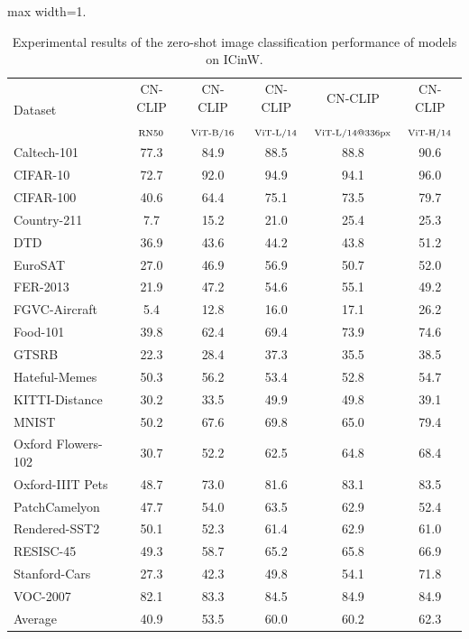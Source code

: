 \begin{table}[t]
\center
\small
\vskip 0.15in
\begin{adjustbox}{max width=1.\textwidth}
\begin{tabular}{@{\extracolsep{\fill}}lccccc}
\toprule
\multirow{2}{*}{Dataset} & CN-CLIP & CN-CLIP & CN-CLIP & CN-CLIP & CN-CLIP \\
 & $\rm_{RN50}$ & $\rm_{ViT\text{-}B/16}$ & $\rm_{ViT\text{-}L/14}$ & $\rm_{ViT\text{-}L/14@336px}$ & $\rm_{ViT\text{-}H/14}$ \\
\midrule
  Caltech-101  & 77.3 & 84.9 & 88.5 & 88.8 & 90.6  \\
  CIFAR-10  & 72.7 & 92.0 & 94.9 & 94.1 & 96.0  \\
  CIFAR-100   & 40.6 & 64.4 & 75.1 & 73.5 & 79.7  \\
  Country-211   & 7.7 & 15.2 & 21.0 & 25.4 & 25.3  \\
  DTD   & 36.9 & 43.6 & 44.2 & 43.8 & 51.2  \\
  EuroSAT   & 27.0 & 46.9 & 56.9 & 50.7 & 52.0  \\
  FER-2013   & 21.9 & 47.2 & 54.6 & 55.1 & 49.2  \\
  FGVC-Aircraft  & 5.4 & 12.8 & 16.0 & 17.1 & 26.2  \\
  Food-101   & 39.8 & 62.4 & 69.4 & 73.9 & 74.6  \\
  GTSRB   & 22.3 & 28.4 & 37.3 & 35.5 & 38.5  \\
  Hateful-Memes   & 50.3 & 56.2 & 53.4 & 52.8 & 54.7  \\
  KITTI-Distance  & 30.2 & 33.5 & 49.9 & 49.8 & 39.1  \\
  MNIST   & 50.2 & 67.6 &69.8 & 65.0 & 79.4  \\
  Oxford Flowers-102   & 30.7 & 52.2 &62.5 & 64.8 & 68.4  \\
  Oxford-IIIT Pets   & 48.7 & 73.0 &81.6 & 83.1 & 83.5  \\
  PatchCamelyon  & 47.7 & 54.0 & 63.5 & 62.9 & 52.4  \\
  Rendered-SST2  & 50.1 & 52.3 & 61.4 & 62.9 & 61.0  \\
  RESISC-45   & 49.3 & 58.7 & 65.2 & 65.8 & 66.9  \\
  Stanford-Cars  & 27.3 & 42.3 &49.8 & 54.1 & 71.8  \\
  VOC-2007  & 82.1 & 83.3 & 84.5 & 84.9 & 84.9  \\
  Average  & 40.9 & 53.5 & 60.0 & 60.2 & 62.3  \\
\bottomrule
\end{tabular}
\end{adjustbox}
\caption{Experimental results of the zero-shot image classification performance of models on ICinW. }
\label{tb:zs}
\end{table}

